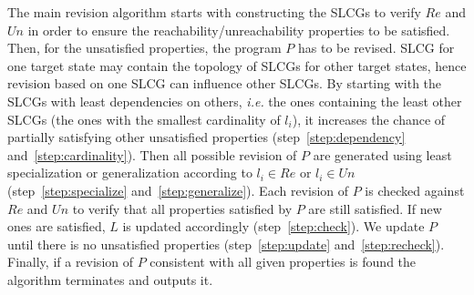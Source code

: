     The main revision algorithm starts with constructing the SLCGs to verify $Re$ and $Un$ in order to ensure the reachability/unreachability properties to be satisfied.
    Then, for the unsatisfied properties, the program $P$ has to be revised.
    SLCG for one target state may contain the topology of SLCGs for other target states, hence revision based on one SLCG can influence other SLCGs.
    By starting with the SLCGs with least dependencies on others, \textit{i.e.} the ones containing the least other SLCGs (the ones with the smallest cardinality of $l_i$), it increases the chance of partially satisfying other unsatisfied properties (step~\ref{step:dependency} and~\ref{step:cardinality}). 
    Then all possible revision of $P$ are generated using least specialization or generalization according to $l_i\in Re$ or $l_i \in Un$ (step~\ref{step:specialize} and~\ref{step:generalize}). 
    Each revision of $P$ is checked against $Re$ and $Un$ to verify that all properties satisfied by $P$ are still satisfied. 
    If new ones are satisfied, $L$ is updated accordingly (step~\ref{step:check}).
    We update $P$ until there is no unsatisfied properties (step~\ref{step:update} and~\ref{step:recheck}).
    Finally, if a revision of $P$ consistent with all given properties is found the algorithm terminates and outputs it.
    
